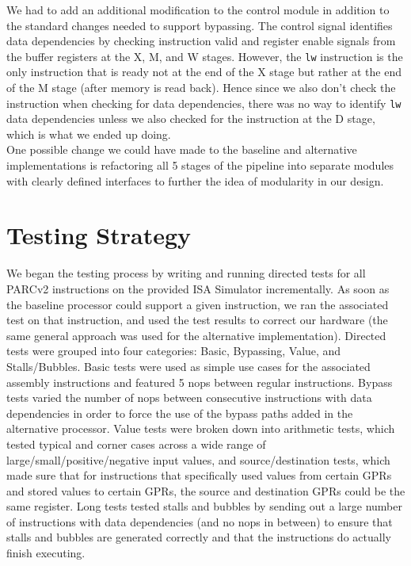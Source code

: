 \documentclass[10pt]{article}
\begin{document}
We had to add an additional modification to the control module in addition to the standard changes needed to support bypassing. The control signal identifies data dependencies by checking instruction valid and register enable signals from the buffer registers at the X, M, and W stages. However, the \texttt{lw} instruction is the only instruction that is ready not at the end of the X stage but rather at the end of the M stage (after memory is read back). Hence since we also don't check the instruction when checking for data dependencies, there was no way to identify \texttt{lw} data dependencies unless we also checked for the instruction at the D stage, which is what we ended up doing. \\

One possible change we could have made to the baseline and alternative implementations is refactoring all 5 stages of the pipeline into separate modules with clearly defined interfaces to further the idea of modularity in our design. 


\section{Testing Strategy}

We began the testing process by writing and running directed tests for all PARCv2 instructions on the provided ISA Simulator incrementally. As soon as the baseline processor could support a given instruction, we ran the associated test on that instruction, and used the test results to correct our hardware (the same general approach was used for the alternative implementation). Directed tests were grouped into four categories: Basic, Bypassing, Value, and Stalls/Bubbles. Basic tests were used as simple use cases for the associated assembly instructions and featured 5 nops between regular instructions. Bypass tests varied the number of nops between consecutive instructions with data dependencies in order to force the use of the bypass paths added in the alternative processor. Value tests were broken down into arithmetic tests, which tested typical and corner cases across a wide range of large/small/positive/negative input values, and source/destination tests, which made sure that for instructions that specifically used values from certain GPRs and stored values to certain GPRs, the source and destination GPRs could be the same register. Long tests tested stalls and bubbles by sending out a large number of instructions with data dependencies (and no nops in between) to ensure that stalls and bubbles are generated correctly and that the instructions do actually finish executing. \\
\end{document}
